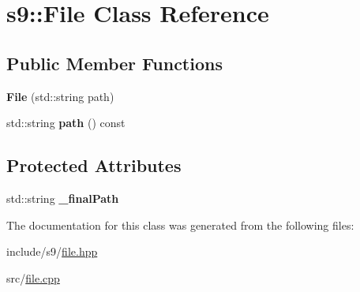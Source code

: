 \hypertarget{classs9_1_1File}{\section{s9\-:\-:\-File \-Class \-Reference}
\label{classs9_1_1File}
}
\subsection*{\-Public \-Member \-Functions}
\begin{DoxyCompactItemize}
\item 
\hypertarget{classs9_1_1File_a4901fbf2e6cebd0adea4ea0cf998530f}{{\bfseries \-File} (std\-::string path)}\label{classs9_1_1File_a4901fbf2e6cebd0adea4ea0cf998530f}

\item 
\hypertarget{classs9_1_1File_a790a68737993d4bf74f1f2ea6fb20c6f}{std\-::string {\bfseries path} () const }\label{classs9_1_1File_a790a68737993d4bf74f1f2ea6fb20c6f}

\end{DoxyCompactItemize}
\subsection*{\-Protected \-Attributes}
\begin{DoxyCompactItemize}
\item 
\hypertarget{classs9_1_1File_ab7a13e2f6ee59e974ff7b192dd6ea188}{std\-::string {\bfseries \-\_\-final\-Path}}\label{classs9_1_1File_ab7a13e2f6ee59e974ff7b192dd6ea188}

\end{DoxyCompactItemize}


\-The documentation for this class was generated from the following files\-:\begin{DoxyCompactItemize}
\item 
include/s9/\hyperlink{file_8hpp}{file.\-hpp}\item 
src/\hyperlink{file_8cpp}{file.\-cpp}\end{DoxyCompactItemize}
